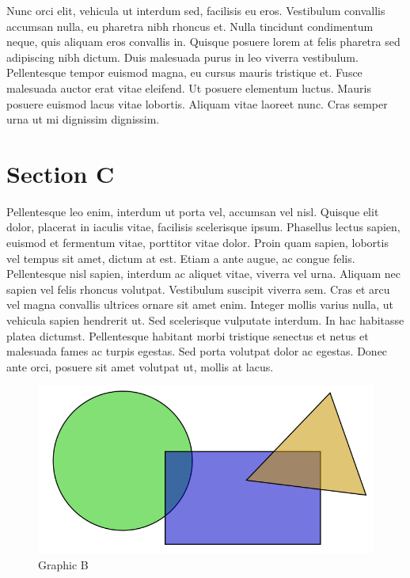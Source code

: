 \documentclass[10pt,oneside]{article}
\begin{document}
Nunc orci elit, vehicula ut interdum sed, facilisis eu eros. Vestibulum convallis accumsan nulla, eu pharetra nibh rhoncus et. Nulla tincidunt condimentum neque, quis aliquam eros convallis in. Quisque posuere lorem at felis pharetra sed adipiscing nibh dictum. Duis malesuada purus in leo viverra vestibulum. Pellentesque tempor euismod magna, eu cursus mauris tristique et. Fusce malesuada auctor erat vitae eleifend. Ut posuere elementum luctus. Mauris posuere euismod lacus vitae lobortis. Aliquam vitae laoreet nunc. Cras semper urna ut mi dignissim dignissim. \cite{book_b}


\section{Section C}


Pellentesque leo enim, interdum ut porta vel, accumsan vel nisl. Quisque elit dolor, placerat in iaculis vitae, facilisis scelerisque ipsum. Phasellus lectus sapien, euismod et fermentum vitae, porttitor vitae dolor. Proin quam sapien, lobortis vel tempus sit amet, dictum at est. Etiam a ante augue, ac congue felis. Pellentesque nisl sapien, interdum ac aliquet vitae, viverra vel urna. Aliquam nec sapien vel felis rhoncus volutpat. Vestibulum suscipit viverra sem. Cras et arcu vel magna convallis ultrices ornare sit amet enim. Integer mollis varius nulla, ut vehicula sapien hendrerit ut. Sed scelerisque vulputate interdum. In hac habitasse platea dictumst. Pellentesque habitant morbi tristique senectus et netus et malesuada fames ac turpis egestas. Sed porta volutpat dolor ac egestas. Donec ante orci, posuere sit amet volutpat ut, mollis at lacus. \cite{book_c}

\begin{figure}[h]
\begin{centering}
    \includegraphics[scale=1]{fig/b/b}
    \caption{Graphic B}
\end{centering}
\end{figure}
\end{document}
